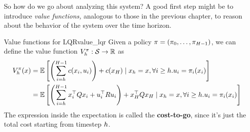\documentclass[../main/main]{subfiles}
\begin{document}
So how do we go about analyzing this system? A good first step might be to introduce \emph{value functions,} analogous to those in the previous chapter, to reason about the behavior of the system over the time horizon.

\begin{definition}{Value functions for LQR}{value_lqr}
    Given a policy $\mathbf{\pi} = (\pi_0, \dots, \pi_{H-1})$, we can define the
    value function $V^\pi_h : \mathcal{S} \to \mathbb{R}$ as
    \[
        \begin{split}
            V^\pi_h (x) &= \operatorname*{\mathbb{E}} \left[ \left( \sum_{i=h}^{H-1} c(x_i, u_i) \right) + c(x_H) \mid x_h = x,  \forall i \ge h. u_i = \pi_i(x_i) \right] \\
            &= \operatorname*{\mathbb{E}} \left[ \left( \sum_{i=h}^{H-1} x_i^\top Q x_i + u_i^\top R u_i \right) + x_H^\top Q x_H \mid x_h = x, \forall i \ge h. u_i = \pi_i(x_i) \right] \\
        \end{split}
    \]
    The expression inside the expectation is called the \textbf{cost-to-go},
    since it's just the total cost starting from timestep $h$.


\end{definition}
\end{document}
